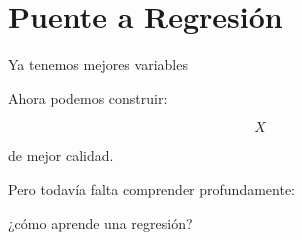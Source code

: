 \documentclass[aspectratio=169,11pt]{beamer}
\begin{document}
\section{Puente a Regresión}

\begin{frame}{Ya tenemos mejores variables}

Ahora podemos construir:

\[
X
\]

de mejor calidad.

Pero todavía falta comprender profundamente:

\begin{center}

\Huge
¿cómo aprende una regresión?
\end{center}

\end{frame}

\end{document}

